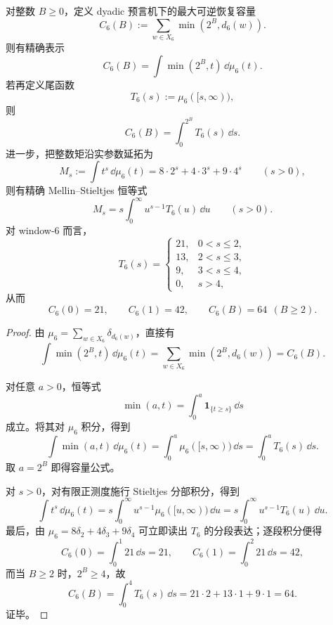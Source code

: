 \begin{theorem}\label{thm:xi-time-part9z-window6-stieltjes-capacity-duality}
对整数 \(B\ge 0\)，定义 dyadic 预言机下的最大可逆恢复容量
\[
C_6(B):=\sum_{w\in X_6}\min(2^B,d_6(w)).
\]
则有精确表示
\[
C_6(B)=\int \min(2^B,t)\,\dd\mu_6(t).
\]
若再定义尾函数
\[
T_6(s):=\mu_6([s,\infty)),
\]
则
\[
C_6(B)=\int_0^{2^B}T_6(s)\,\dd s.
\]
进一步，把整数矩沿实参数延拓为
\[
M_s:=\int t^s\,\dd\mu_6(t)
=
8\cdot 2^s+4\cdot 3^s+9\cdot 4^s
\qquad (s>0),
\]
则有精确 Mellin--Stieltjes 恒等式
\[
M_s=s\int_0^\infty u^{s-1}T_6(u)\,\dd u
\qquad (s>0).
\]
对 window-\(6\) 而言，
\[
T_6(s)=
\begin{cases}
21,& 0<s\le 2,\\
13,& 2<s\le 3,\\
9,& 3<s\le 4,\\
0,& s>4,
\end{cases}
\]
从而
\[
C_6(0)=21,\qquad
C_6(1)=42,\qquad
C_6(B)=64\ \ (B\ge 2).
\]
\end{theorem}
\begin{proof}
由 \(\mu_6=\sum_{w\in X_6}\delta_{d_6(w)}\)，直接有
\[
\int \min(2^B,t)\,\dd\mu_6(t)
=
\sum_{w\in X_6}\min(2^B,d_6(w))
=
C_6(B).
\]

对任意 \(a>0\)，恒等式
\[
\min(a,t)=\int_0^a \mathbf 1_{\{t\ge s\}}\,\dd s
\]
成立。将其对 \(\mu_6\) 积分，得到
\[
\int \min(a,t)\,\dd\mu_6(t)
=
\int_0^a \mu_6([s,\infty))\,\dd s
=
\int_0^a T_6(s)\,\dd s.
\]
取 \(a=2^B\) 即得容量公式。

对 \(s>0\)，对有限正测度施行 Stieltjes 分部积分，得到
\[
\int t^s\,\dd\mu_6(t)
=
s\int_0^\infty u^{s-1}\mu_6([u,\infty))\,\dd u
=
s\int_0^\infty u^{s-1}T_6(u)\,\dd u.
\]
最后，由 \(\mu_6=8\delta_2+4\delta_3+9\delta_4\) 可立即读出 \(T_6\) 的分段表达；逐段积分便得
\[
C_6(0)=\int_0^1 21\,\dd s=21,
\qquad
C_6(1)=\int_0^2 21\,\dd s=42,
\]
而当 \(B\ge 2\) 时，\(2^B\ge 4\)，故
\[
C_6(B)
=
\int_0^4 T_6(s)\,\dd s
=
21\cdot 2+13\cdot 1+9\cdot 1
=
64.
\]
证毕。
\end{proof}
\endinput

